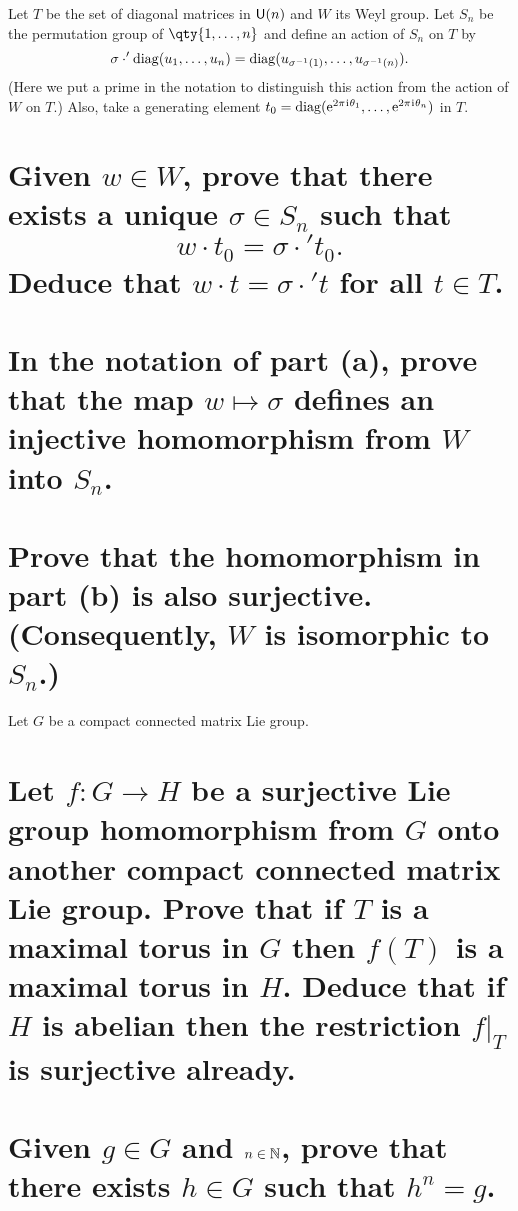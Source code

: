 \documentclass[
	pages,
	boxes,
	color=WildStrawberry
]{homework}
\begin{document}
\begin{problem}
Let $T$ be the set of diagonal matrices in $\mathsf{U}(n)$ and $W$ its Weyl group. Let $S_n$ be the permutation group of $\qty{1, \ldots, n}$ and define an action of $S_n$ on $T$ by
\[
	\sigma \cdot' \operatorname{diag}(u_1, \ldots, u_n) = \operatorname{diag}(u_{\sigma^{-1}(1)}, \ldots, u_{\sigma^{-1}(n)}).
\]
(Here we put a prime in the notation to distinguish this action from the action of $W$ on $T$.) Also, take a generating element $t_0 = \operatorname{diag}(\mathrm{e}^{2\pi\mkern1mu\mathrm{i}\mkern1mu \theta_1}, \ldots, \mathrm{e}^{2\pi\mkern1mu\mathrm{i}\mkern1mu \theta_n})$ in $T$.
\begin{parts}
	\part{Given $w \in W$, prove that there exists a unique $\sigma \in S_n$ such that
		\[
			w \cdot t_0 = \sigma \cdot' t_0.
		\]
		Deduce that $w \cdot t = \sigma \cdot' t$ for all $t \in T$.}\label{part:6a}
	\part{In the notation of part (a), prove that the map $w \mapsto \sigma$ defines an injective homomorphism from $W$ into $S_n$.}\label{part:6b}
	\part{Prove that the homomorphism in part (b) is also surjective. (Consequently, $W$ is isomorphic to $S_n$.)}\label{part:6c}
\end{parts}
\end{problem}

\begin{solution}
	\ref{part:6a}

	\ref{part:6b}

	\ref{part:6c}
\end{solution}

\begin{problem}
Let $G$ be a compact connected matrix Lie group.
\begin{parts}
	\part{Let $f: G \to H$ be a surjective Lie group homomorphism from $G$ onto another compact connected matrix Lie group. Prove that if $T$ is a maximal torus in $G$ then $f(T)$ is a maximal torus in $H$. Deduce that if $H$ is abelian then the restriction $f|_{T}$ is surjective already.}\label{part:8a}
	\part{Given $g \in G$ and $n \in \mathbb{N}$, prove that there exists $h \in G$ such that $h^n = g$.}\label{part:8b}
\end{parts}
\end{problem}
\end{document}
